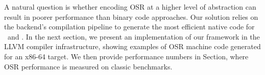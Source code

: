 \noindent A natural question is whether encoding OSR at a higher level of abstraction can result in poorer performance than binary code approaches. Our solution relies on the backend's compilation pipeline to generate the most efficient native code for \fosrfrom\ and \fosrto. In the next section, we present an implementation of our framework in the LLVM compiler infrastructure, showing examples of OSR machine code generated for an x86-64 target. We then provide performance numbers in Section\missing, where OSR performance is measured on classic benchmarks.


